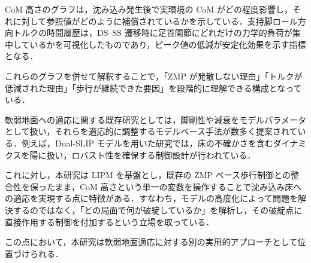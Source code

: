 CoM 高さのグラフは，沈み込み発生後で実環境の CoM がどの程度影響し，それに対して参照値がどのように補償されているかを示している．支持脚ロール方向トルクの時間履歴は，DS--SS 遷移時に足首関節にどれだけの力学的負荷が集中しているかを可視化したものであり，ピーク値の低減が安定化効果を示す指標となる．

これらのグラフを併せて解釈することで，「ZMP が発散しない理由」「トルクが低減された理由」「歩行が継続できた要因」を段階的に理解できる構成となっている．

\label{sec:qa_related_approaches}

軟弱地面への適応に関する既存研究としては，脚剛性や減衰をモデルパラメータとして扱い，それらを適応的に調整するモデルベース手法が数多く提案されている．例えば，Dual-SLIP モデルを用いた研究では，床の不確かさを含むダイナミクスを陽に扱い，ロバスト性を確保する制御設計が行われている．

これに対し，本研究は LIPM を基盤とし，既存の ZMP ベース歩行制御との整合性を保ったまま，CoM 高さという単一の変数を操作することで沈み込み床への適応を実現する点に特徴がある．すなわち，モデルの高度化によって問題を解決するのではなく，「どの局面で何が破綻しているか」を解析し，その破綻点に直接作用する制御を付加するという立場を取っている．

この点において，本研究は軟弱地面適応に対する別の実用的アプローチとして位置づけられる．

